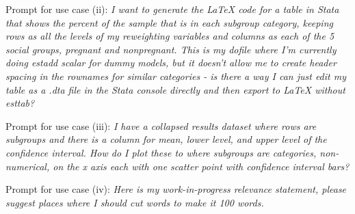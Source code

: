 \documentclass[12pt]{article}
\begin{document}
Prompt for use case (ii):
\emph{I want to generate the LaTeX code for a table in Stata that shows the percent of the sample that is in each subgroup category, keeping rows as all the levels of my reweighting variables and columns as each of the 5 social groups, pregnant and nonpregnant. This is my dofile where I'm currently doing estadd scalar for dummy models, but it doesn't allow me to create header spacing in the rownames for similar categories - is there a way I can just edit my table as a .dta file in the Stata console directly and then export to LaTeX without esttab?}

Prompt for use case (iii): 
\emph{I have a collapsed results dataset where rows are subgroups and there is a column for mean, lower level, and upper level of the confidence interval. How do I plot these to where subgroups are categories, non-numerical, on the x axis each with one scatter point with confidence interval bars?}

Prompt for use case (iv):
\emph{Here is my work-in-progress relevance statement, please suggest places where I should cut words to make it 100 words.}

\newpage




\end{document}
